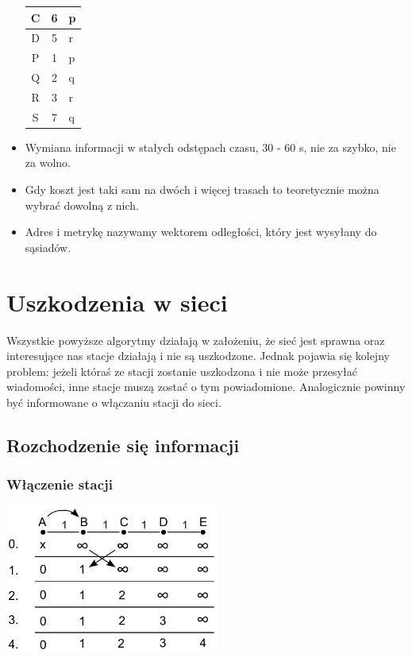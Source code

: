 \begin{itemize}
\begin{table}[h]
\begin{tabular}{|c|c|l|}
							C     & 6       & p                     \\ \hline
							D     & 5       & r                     \\ \hline
							P     & 1       & p                     \\ \hline
							Q     & 2       & q                     \\ \hline
							R     & 3       & r                     \\ \hline
							S     & 7       & q                     \\ \hline
						\end{tabular}
					\end{table}
					\item Wymiana informacji w stałych odstępach czasu, 30 - 60 s, nie za szybko, nie za wolno.
					\item Gdy koszt jest taki sam na dwóch i więcej trasach to teoretycznie można wybrać dowolną z nich.
					\item Adres i metrykę nazywamy wektorem odległości, który jest wysyłany do sąsiadów.
				\end{itemize}
	\section{Uszkodzenia w sieci}
		Wszystkie powyższe algorytmy działają w założeniu, że sieć jest sprawna oraz interesujące nas stacje działają i nie są uszkodzone. Jednak pojawia się kolejny problem: jeżeli któraś ze stacji zostanie uszkodzona i nie może przesyłać wiadomości, inne stacje muszą zostać o tym powiadomione. Analogicznie powinny być informowane o włączaniu stacji do sieci.
		\subsection{Rozchodzenie się informacji}
			\subsubsection{Włączenie stacji}
				\includegraphics[width=7.0cm]{./images/image42.pdf}
